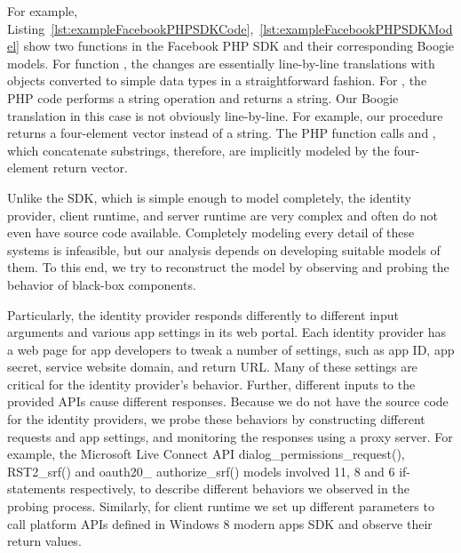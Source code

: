 


For example, Listing~\ref{lst:exampleFacebookPHPSDKCode},~\ref{lst:exampleFacebookPHPSDKModel} show two functions in the Facebook PHP SDK and their corresponding Boogie models. For function , the changes are essentially line-by-line translations with objects converted to simple data types in a straightforward fashion.  For , the PHP code performs a string operation and returns a string.  Our Boogie translation in this case is not obviously line-by-line.  For example, our procedure returns a four-element vector instead of a string.  The PHP function calls  and , which concatenate substrings, therefore, are implicitly modeled by the four-element return vector. 

  Unlike the SDK, which is simple enough to model completely, the identity provider, client runtime, and server runtime are very complex and often do not even have source code available.  Completely modeling every detail of these systems is infeasible, but our analysis depends on developing suitable models of them.  To this end, we try to reconstruct the model by observing and probing the behavior of black-box components.  

Particularly, the identity provider responds differently to different input arguments and various app settings in its web portal.  Each identity provider has a web page for app developers to tweak a number of settings, such as app ID, app secret, service website domain, and return URL.  Many of these settings are critical for the identity provider's behavior.  Further, different inputs to the provided APIs cause different responses.  Because we do not have the source code for the identity providers, we probe these behaviors by constructing different requests and app settings, and monitoring the responses using a proxy server.  For example, the Microsoft Live Connect API dialog\_permissions\_request(), RST2\_srf() and oauth20\_ authorize\_srf() models involved 11, 8 and 6 if-statements respectively, to describe different behaviors we observed in the probing process.  Similarly, for client runtime we set up different parameters to call platform APIs defined in Windows 8 modern apps SDK and observe their return values.

